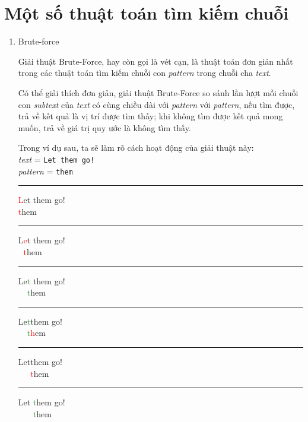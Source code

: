 \documentclass[a4paper,11pt]{article}
\begin{document}
	\section{Một số thuật toán tìm kiếm chuỗi}
	\begin{enumerate}
		\item Brute-force 
		
			Giải thuật Brute-Force, hay còn gọi là vét cạn, 
			là thuật toán đơn giản nhất trong các thuật toán 
			tìm kiếm chuỗi con \textit{pattern} 
			trong chuỗi cha \textit{text}.

			Có thể giải thích đơn giản, giải thuật Brute-Force 
			so sánh lần lượt mỗi chuỗi con \textit{subtext} của \textit{text} 
			có cùng chiều dài với \textit{pattern} với \textit{pattern}, 
			nếu tìm được, trả về kết quả là vị trí được tìm thấy; khi không 
			tìm được kết quả mong muốn, trả về giá trị quy ước là không tìm thấy.

			Trong ví dụ sau, ta sẽ làm rõ cách hoạt động của giải thuật này:\\
			\textit{text} \hspace*{7mm}= \verb|Let them go!| \\
			\textit{pattern} \hspace*{0.1mm} = \verb|them| 
			\vspace*{4mm}
			\hrule
			\textcolor{red}{L}et them go!\\
			\textcolor{red}{t}hem

			\vspace*{2mm}
			\hrule
			L\textcolor{red}{e}t them go!\\
			\textcolor{white}{L}\textcolor{red}{t}hem
			
			\vspace*{2mm}
			\hrule
			Le\textcolor{ForestGreen}{t} them go!\\
			\textcolor{white}{Le}\textcolor{ForestGreen}{t}hem
			
			\vspace*{2mm}
			\hrule
			Le\textcolor{ForestGreen}{t}\textcolor{red}{\textvisiblespace}them go!\\
			\textcolor{white}{Le}\textcolor{ForestGreen}{t}\textcolor{red}{h}em

			\vspace*{2mm}
			\hrule
			Let\textcolor{red}{\textvisiblespace}them go!\\
			\textcolor{white}{Let}\textcolor{red}{t}hem
			
			\vspace*{2mm}
			\hrule
			Let \textcolor{ForestGreen}{t}hem go!\\
			\textcolor{white}{Let }\textcolor{ForestGreen}{t}hem


\end{enumerate}
\end{document}
